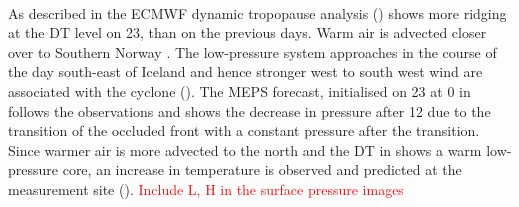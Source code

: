 \\
As described in  the ECMWF dynamic tropopause analysis () shows more ridging at the DT level on \SI{23}{\dec}, than on the previous days. Warm air is advected closer over to Southern Norway . The low-pressure system approaches in the course of the day south-east of Iceland and hence stronger west to south west wind are associated with the cyclone (). The MEPS forecast, initialised on \SI{23}{\dec} at \SI{0}{\UTC} in  follows the observations and shows the decrease in pressure after \SI{12}{\UTC} due to the transition of the occluded front with a constant pressure after the transition. Since warmer air is more advected to the north and the DT in  shows a warm low-pressure core, an increase in temperature is observed and predicted at the measurement site (). \textcolor{red}{Include L, H in the surface pressure images}
